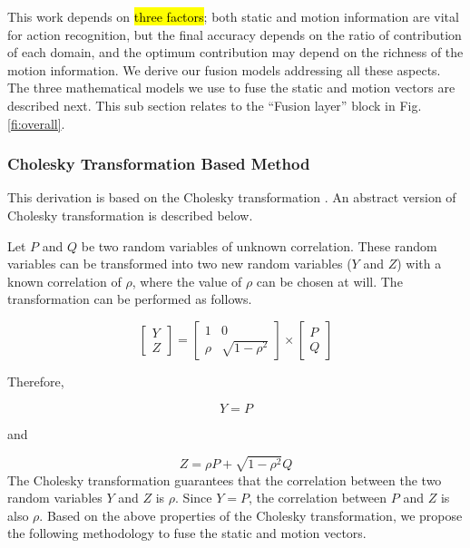 
This work depends on \hl{three factors}; both static and motion information
are vital for action recognition, but the final accuracy depends on the ratio of contribution of each domain,
and the optimum contribution may depend on the richness of the motion information. We derive our fusion models addressing all these aspects.
The three mathematical models we use
to fuse the static and motion vectors are described next. This sub section relates to the ``Fusion layer'' block in Fig. \ref{fi:overall}.

\subsubsection{Cholesky Transformation Based Method}
\label{ss:cholesky}
This derivation is based on the Cholesky transformation \cite{GOLUBG96}. An
abstract version of Cholesky transformation is described below.

Let $P$ and $Q$ be two random variables of unknown correlation. These random variables can be
transformed into two new random variables ($Y$ and $Z$) with a known correlation of $\rho$, where the
value of $\rho$ can be chosen at will. The transformation can be performed as follows.

\begin{equation}
\begin{bmatrix}
    Y     \\
    Z
\end{bmatrix}
=
\begin{bmatrix}
    1  & 0 \\
    \rho  & \sqrt{1-\rho^2}
\end{bmatrix}
\times
\begin{bmatrix}
    P     \\
    Q
\end{bmatrix}
\end{equation}

Therefore,

\begin{equation}
Y = P
\end{equation}

and

\begin{equation}
Z = \rho P + \sqrt{1-\rho^2}Q
\end{equation}
The Cholesky transformation guarantees that the correlation between the two random variables
$Y$ and $Z$ is $\rho$. Since $Y=P$, the correlation between $P$ and $Z$ is also $\rho$. Based on the above properties of the Cholesky transformation, we propose the following methodology to fuse the static and motion vectors.

